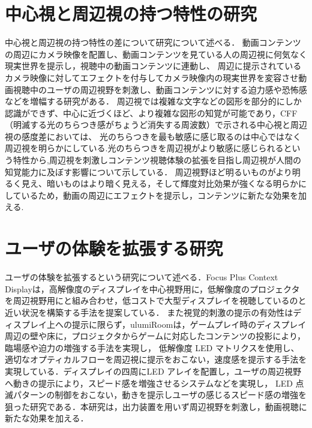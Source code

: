 \section{中心視と周辺視の持つ特性の研究}
中心視と周辺視の持つ特性の差について研究について述べる．
動画コンテンツの周辺にカメラ映像を配置し、動画コンテンツを見ている人の周辺視に何気なく現実世界を提示し，視聴中の動画コンテンツに連動し、
周辺に提示されているカメラ映像に対してエフェクトを付与してカメラ映像内の現実世界を変容させ動画視聴中のユーザの周辺視野を刺激し、動画コンテンツに対する迫力感や恐怖感などを増幅する研究がある\cite{shamo4}．
周辺視では複雑な文字などの図形を部分的にしか認識ができず、中心に近づくほど、より複雑な図形の知覚が可能であり\cite{shamo5}，CFF （明滅する光のちらつき感がちょうど消失する周波数）で示される中心視と周辺視の感度差においては、
光のちらつきを最も敏感に感じ取るのは中心ではなく周辺視を明らかにしている\cite{shamo6}.光のちらつきを周辺視がより敏感に感じられるという特性から,周辺視を刺激しコンテンツ視聴体験の拡張を目指し周辺視が人間の知覚能力に及ぼす影響について示している\cite{shamo7}．
周辺視野ほど明るいものがより明るく見え、暗いものはより暗く見える，そして輝度対比効果が強くなる明らかにしているため\cite{shamo8}，動画の周辺にエフェクトを提示し，コンテンツに新たな効果を加える.

\section{ユーザの体験を拡張する研究}
ユーザの体験を拡張するという研究について述べる．Focus Plus Context Displayは，高解像度のディスプレイを中心視野用に，低解像度のプロジェクタを周辺視野用にと組み合わせ，低コストで大型ディスプレイを視聴しているのと近い状況を構築する手法を提案している\cite{shamo9}．
また視覚的刺激の提示の有効性はディスプレイ上への提示に限らず，ulumiRoomは，ゲームプレイ時のディスプレイ周辺の壁や床に，プロジェクタからゲームに対応したコンテンツの投影により，臨場感や迫力の増強する手法を実現し\cite{shamo10}，
低解像度 LED マトリクスを使用し、適切なオプティカルフローを周辺視に提示をおこない，速度感を提示する手法を実現している\cite{shamo11}．ディスプレイの四周にLED アレイを配置し，ユーザの周辺視野へ動きの提示により，スピード感を増強させるシステムなどを実現し，
LED 点滅パターンの制御をおこない，動きを提示しユーザの感じるスピード感の増強を狙った研究である\cite{shamo12}．本研究は，出力装置を用いず周辺視野を刺激し，動画視聴に新たな効果を加える．
